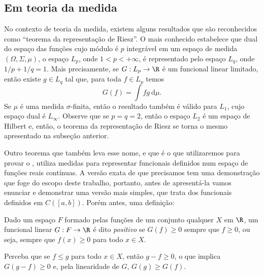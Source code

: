 \subsection{Em teoria da medida}

No contexto de teoria da medida, existem alguns resultados que são reconhecidos como ``teorema da representação de Riesz''.
O mais conhecido estabelece que dual do espaço das funções cujo módulo é \( p \) integrável em um espaço de medida \( (\Omega, \Sigma, \mu) \), o espaço \( L_{ p } \), onde \( 1 < p < +\infty \), é representado pelo espaço \( L_{ q } \), onde \( 1/p + 1/q = 1 \).
Mais precisamente, se \( G : L_{ p } \to \R \) é um funcional linear limitado, então existe \( g \in L_{ q } \) tal que, para toda \( f \in L_{ p } \) temos \[
    G(f) = \int fg \ \mathrm{d}\mu
.\]
Se \( \mu \) é uma medida \( \sigma \)-finita, então o resultado também é válido para \( L_{ 1 } \), cujo espaço dual é \( L_{ \infty } \).
Observe que se \(  p = q = 2 \), então o espaço \( L_{ 2 } \) é um espaço de Hilbert e, então, o teorema da representação de Riesz se torna o mesmo apresentado na subseção anterior.

Outro teorema que também leva esse nome, e que é o que utilizaremos para provar o \uat , utiliza medidas para representar funcionais definidos num espaço de funções reais contínuas.
A versão exata de que precisamos tem uma demonstração que foge do escopo deste trabalho, portanto, antes de apresentá-la vamos enunciar e demonstrar uma versão mais simples, que trata dos funcionais definidos em \( C([a, b]) \).
Porém antes, uma definição:
\begin{defn}
    Dado um espaço \( F \) formado pelas funções de um conjunto qualquer \( X \) em \( \R \), um funcional linear \( G : F \to \R \) é dito \emph{positivo} se \( G(f) \geq 0 \) sempre que \( f \geq 0 \), ou seja, sempre que \( f(x) \geq 0 \) para todo \( x \in X \).
\end{defn}

\begin{rem}
    Perceba que se \( f \leq g \) para todo \( x \in X \), então \( g-f \geq 0 \), o que implica \( G(g-f) \geq 0 \) e, pela linearidade de \( G \), \( G(g) \geq G(f) \).
\end{rem}

